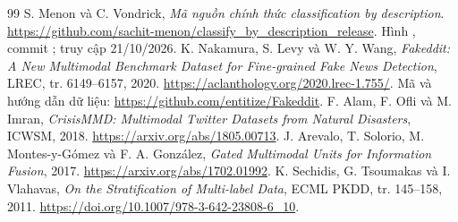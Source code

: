 \documentclass[12pt,a4paper]{article}
\begin{document}
\begin{thebibliography}{99}
 S. Menon và C. Vondrick, \textit{Mã nguồn chính thức classification by description}. \url{https://github.com/sachit-menon/classify_by_description_release}. Hình , commit ; truy cập 21/10/2026.
 K. Nakamura, S. Levy và W. Y. Wang, \textit{Fakeddit: A New Multimodal Benchmark Dataset for Fine-grained Fake News Detection}, LREC, tr. 6149--6157, 2020. \url{https://aclanthology.org/2020.lrec-1.755/}. Mã và hướng dẫn dữ liệu: \url{https://github.com/entitize/Fakeddit}.
 F. Alam, F. Ofli và M. Imran, \textit{CrisisMMD: Multimodal Twitter Datasets from Natural Disasters}, ICWSM, 2018. \url{https://arxiv.org/abs/1805.00713}.
 J. Arevalo, T. Solorio, M. Montes-y-Gómez và F. A. González, \textit{Gated Multimodal Units for Information Fusion}, 2017. \url{https://arxiv.org/abs/1702.01992}.
 K. Sechidis, G. Tsoumakas và I. Vlahavas, \textit{On the Stratification of Multi-label Data}, ECML PKDD, tr. 145--158, 2011. \url{https://doi.org/10.1007/978-3-642-23808-6_10}.
\end{thebibliography}\endgroup
\end{document}

